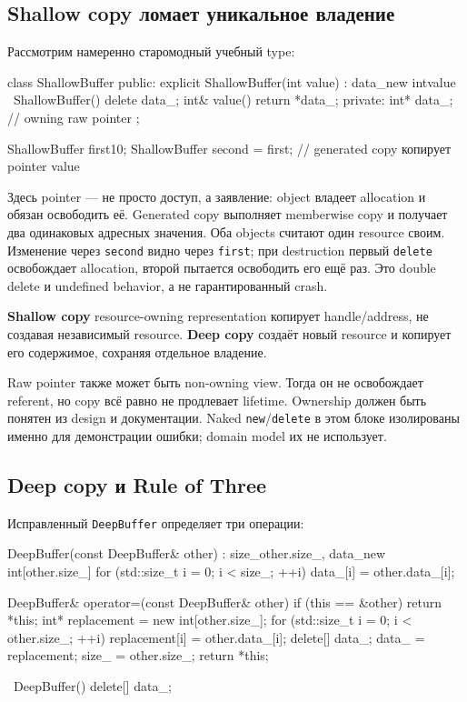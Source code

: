 \subsection{Shallow copy ломает уникальное владение}

Рассмотрим намеренно старомодный учебный type:

\begin{cppcode}
class ShallowBuffer {
public:
    explicit ShallowBuffer(int value) : data_{new int{value}} {}
    ~ShallowBuffer() { delete data_; }
    int& value() { return *data_; }
private:
    int* data_; // owning raw pointer
};

ShallowBuffer first{10};
ShallowBuffer second = first; // generated copy копирует pointer value
\end{cppcode}

Здесь pointer --- не просто доступ, а заявление: object владеет allocation и
обязан освободить её. Generated copy выполняет memberwise copy и получает два
одинаковых адресных значения. Оба objects считают один resource своим.
Изменение через \texttt{second} видно через \texttt{first}; при destruction
первый \texttt{delete} освобождает allocation, второй пытается освободить его
ещё раз. Это double delete и undefined behavior, а не гарантированный crash.

\begin{definition}
\textbf{Shallow copy} resource-owning representation копирует handle/address,
не создавая независимый resource. \textbf{Deep copy} создаёт новый resource и
копирует его содержимое, сохраняя отдельное владение.
\end{definition}

Raw pointer также может быть non-owning view. Тогда он не освобождает referent,
но copy всё равно не продлевает lifetime. Ownership должен быть понятен из
design и документации. Naked \texttt{new}/\texttt{delete} в этом блоке
изолированы именно для демонстрации ошибки; domain model их не использует.

\subsection{Deep copy и Rule of Three}

Исправленный \texttt{DeepBuffer} определяет три операции:

\begin{cppcode}
DeepBuffer(const DeepBuffer& other)
    : size_{other.size_}, data_{new int[other.size_]} {
    for (std::size_t i = 0; i < size_; ++i) {
        data_[i] = other.data_[i];
    }
}

DeepBuffer& operator=(const DeepBuffer& other) {
    if (this == &other) {
        return *this;
    }
    int* replacement = new int[other.size_];
    for (std::size_t i = 0; i < other.size_; ++i) {
        replacement[i] = other.data_[i];
    }
    delete[] data_;
    data_ = replacement;
    size_ = other.size_;
    return *this;
}

~DeepBuffer() { delete[] data_; }
\end{cppcode}

